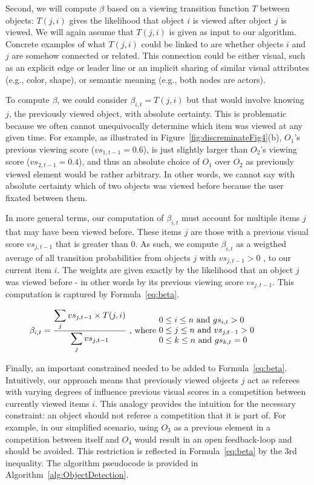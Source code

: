 Second, we will compute $\beta$ based on a viewing transition function $T$ between objects:  $T(j,i)$ gives the likelihood that object $i$ is viewed after object $j$ is viewed. We will again assume that $T(j,i)$ is given as input to our algorithm. Concrete examples of what $T(j,i)$ could be linked to are whether objects $i$ and $j$ are somehow connected or related. This connection could be either visual, such as an explicit edge or leader line or an implicit sharing of similar visual attributes (e.g., color, shape), or semantic meaning (e.g., both nodes are actors). 

To compute $\beta$, we could consider $\beta_{i,t} = T(j,i)$ but that would involve knowing $j$, the previously viewed object, with absolute certainty. This is problematic because we often cannot unequivocally determine which item was viewed at any given time. For example, as illustrated in Figure~\ref{fig:discreminateFig4}(b), $O_1$'s previous viewing score ($vs_{1,t-1}=0.6$), is just slightly larger than $O_2$'s viewing score ($vs_{2,t-1}=0.4$), and thus an absolute choice of $O_1$ over $O_2$ as previously viewed element would be rather arbitrary.  In other words, we cannot say with absolute certainty which of two objects was viewed before because the user fixated between them. 

In more general terms, our computation of $\beta_{i,t}$ must account for multiple items $j$ that may have been viewed before. These items $j$ are those with a previous visual score $vs_{j,t-1}$ that is greater than $0$.  As such, we compute $\beta_{i,t}$ as a weigthed average of all transition probabilities from objects $j$ with $vs_{j,t-1} > 0$ , to our current item $i$. The weights are given exactly by the likelihood that an object $j$ was viewed before - in other words by its previous viewing score $vs_{j,t-1}$. This computation is captured by Formula~\ref{eq:beta}. 

\begin{equation}
\beta_{i,t} = \frac{\displaystyle\sum_{j} {vs_{j,t-1} \times T(j,i)}}{\displaystyle\sum_{j} vs_{j,t-1}} \text{ , where  } \parbox{15em}{$0\leq i \leq n$ and $gs_{i,t} > 0$\\$0\leq j \leq n$ and $vs_{j,t-1} > 0 $\\ $0\leq k \leq n$ and $gs_{k,t} = 0$ }
\label{eq:beta}
\end{equation} 

Finally, an important constrained needed to be added to Formula~\ref{eq:beta}. Intuitively, our approach means that previously viewed objects $j$ act as referees with varying degrees of influence previous visual scores in a competition between currently viewed items $i$. This analogy provides the intuition for the necessary constraint: an object should not referee a competition that it is part of. For example, in our simplified scenario, using $O_3$ as a previous element in a competition between itself and $O_4$ would result in an open feedback-loop and should be avoided. This restriction is reflected in Formula~\ref{eq:beta} by the 3rd inequality.  The algorithm pseudocode is provided in Algorithm~\ref{alg:ObjectDetection}.

